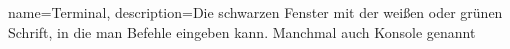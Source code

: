{
    name=Terminal,
    description={Die schwarzen Fenster mit der weißen oder grünen Schrift, in die man Befehle eingeben kann. Manchmal auch Konsole genannt}
}


